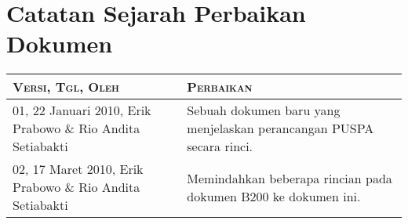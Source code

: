 \part*{\textcolor{sectioncolor}{\textsf{\large Catatan Sejarah Perbaikan Dokumen}}}

\begin{tabular}{|p{4cm}|p{11cm}|}
\hline
{\scshape Versi, Tgl, Oleh} & {\scshape Perbaikan}\\
\hline
01, 22 Januari 2010, Erik Prabowo \& Rio Andita Setiabakti & Sebuah dokumen baru yang menjelaskan perancangan PUSPA secara rinci.\\
\hline
02, 17 Maret 2010, Erik Prabowo \& Rio Andita Setiabakti & Memindahkan beberapa rincian pada dokumen B200 ke dokumen ini.\\
\hline
\end{tabular}
